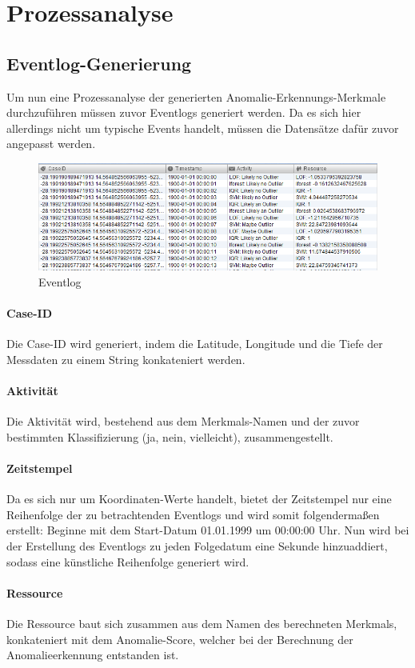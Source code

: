 \section{Prozessanalyse}
\subsection{Eventlog-Generierung}
Um nun eine Prozessanalyse der generierten Anomalie-Erkennungs-Merkmale durchzuführen müssen zuvor Eventlogs generiert werden. Da es sich hier allerdings nicht um typische Events handelt, müssen die Datensätze dafür zuvor angepasst werden.

\begin{figure}[h!]
	\includegraphics[width=\textwidth]{img/eventlog.png}
	\caption[Eventlog]{Eventlog}
	\label{fig:eventlog}
\end{figure}
 
\paragraph{Case-ID} 
Die Case-ID wird generiert, indem die Latitude, Longitude und die Tiefe der Messdaten zu einem String konkateniert werden. 
\paragraph{Aktivität}
Die Aktivität wird, bestehend aus dem Merkmals-Namen und der zuvor bestimmten Klassifizierung (ja, nein, vielleicht), zusammengestellt. 
\paragraph{Zeitstempel}
Da es sich nur um Koordinaten-Werte handelt, bietet der Zeitstempel nur eine Reihenfolge der zu betrachtenden Eventlogs und wird somit folgendermaßen erstellt: Beginne mit dem Start-Datum 01.01.1999 um 00:00:00 Uhr. Nun wird bei der Erstellung des Eventlogs zu jeden Folgedatum eine Sekunde hinzuaddiert, sodass eine künstliche Reihenfolge generiert wird.
\paragraph{Ressource}
Die Ressource baut sich zusammen aus dem Namen des berechneten Merkmals, konkateniert mit dem Anomalie-Score, welcher bei der Berechnung der Anomalieerkennung entstanden ist.


